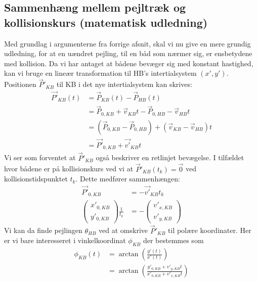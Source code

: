 \documentclass[%
 reprint,
nofootinbib,
aps,
]{revtex4-1}
\begin{document}
\subsection{Sammenhæng mellem pejltræk og kollisionskurs (matematisk udledning)}\label{sec:pejling_betydning}
Med grundlag i argumenterne fra forrige afsnit, skal vi nu give en mere grundig udledning, for at en uændret pejling, til en båd som nærmer sig, er ensbetydene med kollision. Da vi har antaget at bådene bevæger sig med konstant hastighed, kan vi bruge en lineær transformation til HB's intertialsystem $(x',y')$. Positionen $\vec{P}'_{KB}$ til KB i det nye intertialsystem kan skrives:
\begin{align*}
  \vec{P'}_{KB}(t) &= \vec{P}_{KB}(t) - \vec{P}_{HB}(t) \\
  &= \vec{P}_{0,KB} + \vec{v}_{KB}t - \vec{P}_{0,HB} - \vec{v}_{HB}t \\
  &= (\vec{P}_{0,KB} - \vec{P}_{0,HB}) + (\vec{v}_{KB} - \vec{v}_{HB})t \\
  &= \vec{P'}_{0,KB} + \vec{v'}_{KB}t
\end{align*}
Vi ser som forventet at $\vec{P}'_{KB}$ også beskriver en retlinjet bevægelse. I tilfældet hvor bådene er på kollisionskurs ved vi at $\vec{P}'_{KB}(t_k) = \vec{0}$ ved kollisionstidspunktet $t_{k}$. Dette medfører sammenhængen:
\begin{align}
  \vec{P'}_{0,KB} &= - \vec{v'}_{KB}t_k \nonumber \\
  \begin{pmatrix} x'_{0,KB} \\ y'_{0,KB} \end{pmatrix}\frac{1}{t_k} &=   -\begin{pmatrix} v'_{x,KB} \\ v'_{y,KB} \end{pmatrix}
  \label{eq:P=v}
\end{align}
Vi kan da finde pejlingen $\theta_{HB}$ ved at omskrive $\vec{P}'_{KB}$ til polære koordinater. Her er vi bare interesseret i vinkelkoordinat $\phi_{KB}$ der bestemmes som
\begin{align*}
  \phi_{KB}(t) &= \arctan{\left( \frac{y'(t)}{x'(t)}\right)} \\
  &= \arctan{\left( \frac{y'_{0,KB} + v'_{y,KB}t}{x'_{0,KB} + v'_{x,KB}t}\right)}
\end{align*}
\end{document}
